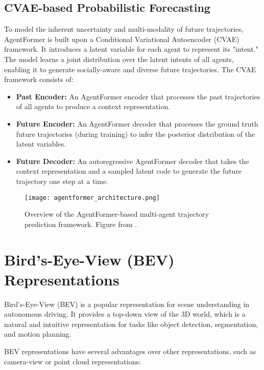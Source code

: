 \subsection{CVAE-based Probabilistic Forecasting}

To model the inherent uncertainty and multi-modality of future trajectories, AgentFormer is built upon a Conditional Variational Autoencoder (CVAE) framework. It introduces a latent variable for each agent to represent its "intent." The model learns a joint distribution over the latent intents of all agents, enabling it to generate socially-aware and diverse future trajectories. The CVAE framework consists of:

\begin{itemize}
    \item \textbf{Past Encoder:} An AgentFormer encoder that processes the past trajectories of all agents to produce a context representation.
    \item \textbf{Future Encoder:} An AgentFormer decoder that processes the ground truth future trajectories (during training) to infer the posterior distribution of the latent variables.
    \item \textbf{Future Decoder:} An autoregressive AgentFormer decoder that takes the context representation and a sampled latent code to generate the future trajectory one step at a time.
\end{itemize}

\begin{figure}[h]
\centering
\texttt{[image: agentformer\_architecture.png]}
\caption{Overview of the AgentFormer-based multi-agent trajectory prediction framework. Figure from \citep{yuan2021agentformer}.}
\label{fig:agentformer_architecture}
\end{figure}


\section{Bird's-Eye-View (BEV) Representations}

Bird's-Eye-View (BEV) is a popular representation for scene understanding in autonomous driving. It provides a top-down view of the 3D world, which is a natural and intuitive representation for tasks like object detection, segmentation, and motion planning.

BEV representations have several advantages over other representations, such as camera-view or point cloud representations:

